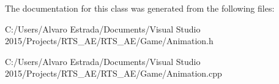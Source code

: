 The documentation for this class was generated from the following files\+:\begin{DoxyCompactItemize}
\item 
C\+:/\+Users/\+Alvaro Estrada/\+Documents/\+Visual Studio 2015/\+Projects/\+R\+T\+S\+\_\+\+A\+E/\+R\+T\+S\+\_\+\+A\+E/\+Game/Animation.\+h\item 
C\+:/\+Users/\+Alvaro Estrada/\+Documents/\+Visual Studio 2015/\+Projects/\+R\+T\+S\+\_\+\+A\+E/\+R\+T\+S\+\_\+\+A\+E/\+Game/Animation.\+cpp\end{DoxyCompactItemize}
